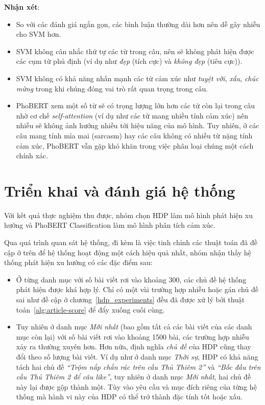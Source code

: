 \textbf{Nhận xét}:
\begin{itemize}
    \item So với các đánh giá ngắn gọn, các bình luận thường dài hơn nên dễ gây nhiễu cho SVM hơn.
    \item SVM không cân nhắc thứ tự các từ trong câu, nên sẽ không phát hiện được các cụm từ phủ định (ví dụ như \textit{đẹp} (tích cực) và \textit{không đẹp} (tiêu cực)).
    \item SVM không có khả năng nhấn mạnh các từ cảm xúc như \textit{tuyệt vời}, \textit{xấu}, \textit{chúc mừng} trong khi chúng đóng vai trò rất quan trọng trong câu.
    \item PhoBERT xem một số từ sẽ có trọng lượng lớn hơn các từ còn lại trong câu nhờ cơ chế \textit{self-attention} (ví dụ như các từ mang nhiều tính cảm xúc) nên nhiễu sẽ không ảnh hưởng nhiều tới hiệu năng của mô hình. Tuy nhiên, ở các câu mang tính mỉa mai (sarcasm) hay các câu không có nhiều từ nặng tính cảm xúc, PhoBERT vẫn gặp khó khăn trong việc phân loại chúng một cách chính xác.
\end{itemize}


\section{Triển khai và đánh giá hệ thống}
Với kết quả thực nghiệm thu được, nhóm chọn \acrshort{HDP} làm mô hình phát hiện xu hướng và PhoBERT Classification làm mô hình phân tích cảm xúc.

Qua quá trình quan sát hệ thống, đi kèm là việc tinh chỉnh các thuật toán đã đề cập ở trên để hệ thống hoạt động một cách hiệu quả nhất, nhóm nhận thấy hệ thống phát hiện xu hướng có các đặc điểm sau:
\begin{itemize}
    \item Ở từng danh mục với số bài viết rơi vào khoảng 300, các chủ đề hệ thống phát hiện được khá hợp lý. Chỉ có một vài trường hợp nhiễu hoặc gán chủ đề sai như đề cập ở chương~\ref{hdp_experiments} đều đã được xử lý bởi thuật toán~\ref{alg:article-score} để đẩy xuống cuối cùng.
    \item Tuy nhiên ở danh mục \textit{Mới nhất} (bao gồm tất cả các bài viết của các danh mục còn lại) với số bài viết rơi vào khoảng 1500 bài, các trường hợp nhiễu xảy ra thường xuyên hơn. Hơn nữa, định nghĩa \textit{chủ đề} của \acrshort{HDP} cũng thay đổi theo số lượng bài viết. Ví dụ như ở danh mục \textit{Thời sự}, \acrshort{HDP} có khả năng tách hai chủ đề \textit{``Trộm nắp chắn rác trên cầu Thủ Thiêm 2''} và \textit{``Bốc đầu trên cầu Thủ Thiêm 2 để câu like''}, tuy nhiên ở danh mục \textit{Mới nhất}, hai chủ đề này lại được gộp thành một. Tùy vào yêu cầu và mục đích riêng của từng hệ thống mà hành vi này của \acrshort{HDP} có thể trở thành đặc tính tốt hoặc xấu.
\end{itemize}

